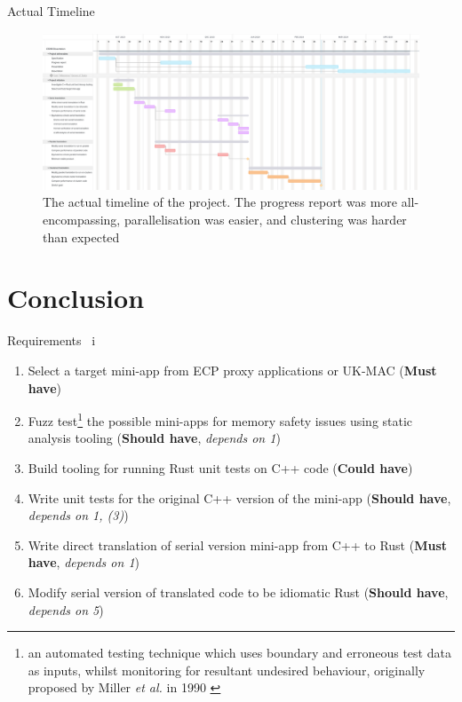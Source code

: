 \documentclass[10pt,aspectratio=169]{beamer}
\newcommand{\cmark}{\ding{51}}
\newcommand{\done}{\rlap{$\square$}{\raisebox{2pt}{\large\hspace{1pt}\textcolor{green}{\cmark}}}\hspace{-2.5pt}}
\begin{document}
\begin{frame}{Actual Timeline}
    \begin{figure}[h]
        \centering
        \includegraphics[width=\textwidth]{images/actual_gantt_chart.png}
        \caption{The actual timeline of the project. The progress report was more all-encompassing, parallelisation was easier, and clustering was harder than expected}
        \label{fig:actual_gantt_chart}
    \end{figure}
\end{frame}



\section{Conclusion}

\begin{frame}{Requirements \ i}
    \begin{enumerate}
        \item[\done\ \ 1.]
          Select a target mini-app from ECP proxy applications or UK-MAC
          (\textbf{Must have})
        \item[\done\ \ 2.]
          Fuzz test\footnote{an automated testing technique which uses boundary and erroneous test data as inputs, whilst monitoring for resultant undesired behaviour, originally proposed by Miller \textit{et al.} in 1990 \cite{millerEmpiricalStudyReliability1990}\cite{liangFuzzingStateArt2018}} the possible mini-apps for memory safety issues using static analysis tooling \cite{stepanovMemorySanitizerFastDetector2015}
          (\textbf{Should have}, \textit{depends on 1})
        \item[\done\ \ 3.]
          Build tooling for running Rust unit tests on C++ code
          (\textbf{Could have})
        \item[\done\ \ 4.]
          Write unit tests for the original C++ version of the
          mini-app
          (\textbf{Should have}, \textit{depends on 1, (3)})
        \item[\done\ \ 5.]
          Write direct translation of serial version mini-app from C++ to Rust
          (\textbf{Must have}, \textit{depends on 1})
        \item[\done\ \ 6.]
          Modify serial version of translated code to be idiomatic Rust \cite{endlerMreIdiomaticrust2023} 
          (\textbf{Should have}, \textit{depends on 5})
    \end{enumerate}
\end{frame}
\end{document}
